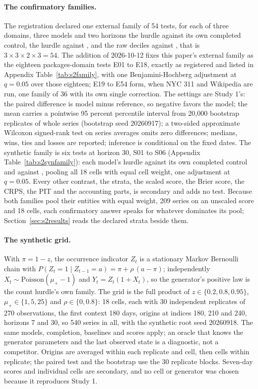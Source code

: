 \paragraph{The confirmatory families.} The registration declared one external family of 54 tests, for each
of three domains, three models and two horizons the hurdle against its own completed control, the hurdle
against \hc{}, and the raw deciles against \lm{}, that is $3 \times 3 \times 2 \times 3 = 54$. The addition
of 2026-10-12 fixes this paper's external family as the eighteen packages-domain tests E01 to E18, exactly as
registered and listed in Appendix Table~\ref{tab:s2family}, with one Benjamini-Hochberg adjustment at
$q = 0.05$ over those eighteen; E19 to E54 form, when NYC 311 and Wikipedia are run, one family of 36 with
its own single correction. The settings are Study 1's: the paired difference is model minus reference, so
negative favors the model; the mean carries a pointwise 95 percent percentile interval from 20,000 bootstrap
replicates of whole series (bootstrap seed 20260917); a two-sided approximate Wilcoxon signed-rank test on
series averages omits zero differences; medians, wins, ties and losses are reported; inference is
conditional on the fixed dates. The synthetic family is six tests at horizon 30, S01 to S06 (Appendix
Table~\ref{tab:s2synfamily}): each model's hurdle against its own completed control and against \hc{},
pooling all 18 cells with equal cell weight, one adjustment at $q = 0.05$. Every other contrast, the strata,
the scaled score, the Brier score, the CRPS, the PIT and the accounting parts, is secondary and adds no
test. Because both families pool their entities with equal weight, 209 series on an unscaled score and 18
cells, each confirmatory answer speaks for whatever dominates its pool; Section~\ref{sec:s2results} reads
the declared strata beside them.

\paragraph{The synthetic grid.} With $\pi = 1 - z$, the occurrence indicator $Z_t$ is a stationary Markov
Bernoulli chain with $P(Z_t = 1 \mid Z_{t-1} = a) = \pi + \rho\,(a - \pi)$; independently $X_t \sim
\text{Poisson}(\mu_{+} - 1)$ and $Y_t = Z_t (1 + X_t)$, so the generator's positive law is the count
hurdle's own family. The grid is the full product of $z \in \{0.2, 0.8, 0.95\}$, $\mu_{+} \in \{1, 5, 25\}$
and $\rho \in \{0, 0.8\}$: 18 cells, each with 30 independent replicates of 270 observations, the first
context 180 days, origins at indices 180, 210 and 240, horizons 7 and 30, so 540 series in all, with the
synthetic root seed 20260918. The same models, completion, baselines and scores apply; an oracle that knows
the generator parameters and the last observed state is a diagnostic, not a competitor. Origins are averaged
within each replicate and cell, then cells within replicate; the paired test and the bootstrap use the 30
replicate blocks. Seven-day scores and individual cells are secondary, and no cell or generator was chosen
because it reproduces Study 1.
